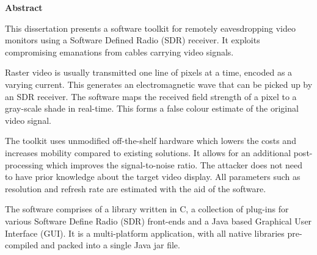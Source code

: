 \newpage
{\Huge \bf Abstract}
\vspace{24pt} 


This dissertation presents a software toolkit for remotely eavesdropping video monitors using a Software Defined Radio (SDR) receiver. It exploits compromising emanations from cables carrying video signals.

Raster video is usually transmitted one line of pixels at a time, encoded as a varying current. This generates an electromagnetic wave that can be picked up by an SDR receiver. The software maps the received field strength of a pixel to a gray-scale shade in real-time. This forms a false colour estimate of the original video signal.

The toolkit uses unmodified off-the-shelf hardware which lowers the costs and increases mobility compared to existing solutions. It allows for an additional post-processing which improves the signal-to-noise ratio. The attacker does not need to have prior knowledge about the target video display. All parameters such as resolution and refresh rate are estimated with the aid of the software. 

The software comprises of a library written in C, a collection of plug-ins for various Software Define Radio (SDR) front-ends and a Java based Graphical User Interface (GUI). It is a multi-platform application, with all native libraries pre-compiled and packed into a single Java jar file.


\newpage
\vspace*{\fill}
